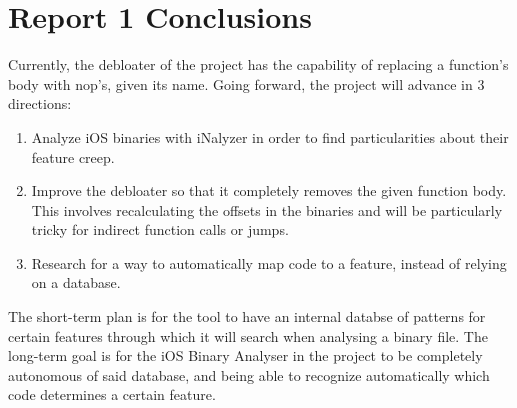 \section{Report 1 Conclusions}
Currently, the debloater of the project has the capability of replacing a function's body with nop's, given its name.
Going forward, the project will advance in 3 directions:
\begin{enumerate}
	\item Analyze iOS binaries with iNalyzer in order to find particularities about their feature creep.
	\item Improve the debloater so that it completely removes the given function body. This involves
	recalculating the offsets in the binaries and will be particularly tricky for indirect function calls or jumps.
	\item Research for a way to automatically map code to a feature, instead of relying on a database.
\end{enumerate}

The short-term plan is for the tool to have an internal databse of patterns for certain features through
which it will search when analysing a binary file.
The long-term goal is for the iOS Binary Analyser in the project to be completely autonomous of said database,
and being able to recognize automatically which code determines a certain feature.